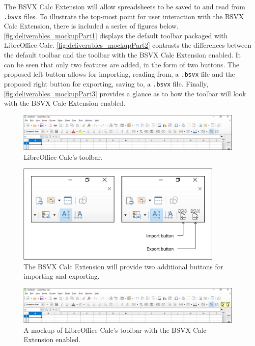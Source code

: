 \documentclass[10pt]{article}
\begin{document}
\indent{}
The BSVX Calc Extension will allow spreadsheets to be saved to and read from \texttt{.bsvx} files.
To illustrate the top-most point for user interaction with the BSVX Calc Extension, there is included a series of figures below. 
\autoref{fig:deliverables_mockupPart1} displays the default toolbar packaged with LibreOffice Calc.
\autoref{fig:deliverables_mockupPart2} contrasts the differences between the default toolbar and the toolbar with the BSVX Calc Extension enabled.
It can be seen that only two features are added, in the form of two buttons.
The proposed left button allows for importing, reading from, a \texttt{.bsvx} file and the proposed right button for exporting, saving to, a \texttt{.bsvx} file.
Finally, \autoref{fig:deliverables_mockupPart3} provides a glance as to how the toolbar will look with the BSVX Calc Extension enabled.

\begin{figure}[H]
\centering
\includegraphics[width=\textwidth]{figures/mockupPart1.png}
\caption{LibreOffice Calc's toolbar.}
\label{fig:deliverables_mockupPart1}
\end{figure}

\begin{figure}[H]
\centering
\includegraphics[width=4in]{figures/mockupPart2.png}
\caption{The BSVX Calc Extension will provide two additional buttons for importing and exporting.}
\label{fig:deliverables_mockupPart2}
\end{figure}

\begin{figure}[H]
\centering
\includegraphics[width=\textwidth]{figures/mockupPart3.png}
\caption{A mockup of LibreOffice Calc's toolbar with the BSVX Calc Extension enabled.}
\label{fig:deliverables_mockupPart3}
\end{figure}
\end{document}
